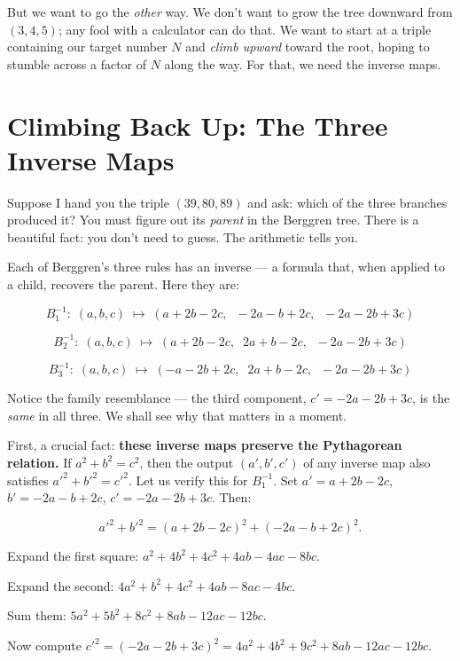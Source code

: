 But we want to go the \textit{other} way. We don't want to grow the tree downward from $(3,4,5)$; any fool with a calculator can do that. We want to start at a triple containing our target number $N$ and \textit{climb upward} toward the root, hoping to stumble across a factor of $N$ along the way. For that, we need the inverse maps.


\ornbreak



\section{Climbing Back Up: The Three Inverse Maps}


Suppose I hand you the triple $(39, 80, 89)$ and ask: which of the three branches produced it? You must figure out its \textit{parent} in the Berggren tree. There is a beautiful fact: you don't need to guess. The arithmetic tells you.

Each of Berggren's three rules has an inverse --- a formula that, when applied to a child, recovers the parent. Here they are:

\[
B_1^{-1}:\; (a,b,c) \;\longmapsto\; (a + 2b - 2c,\;\; -2a - b + 2c,\;\; -2a - 2b + 3c)
\]

\[
B_2^{-1}:\; (a,b,c) \;\longmapsto\; (a + 2b - 2c,\;\; 2a + b - 2c,\;\; -2a - 2b + 3c)
\]

\[
B_3^{-1}:\; (a,b,c) \;\longmapsto\; (-a - 2b + 2c,\;\; 2a + b - 2c,\;\; -2a - 2b + 3c)
\]

Notice the family resemblance --- the third component, $c' = -2a - 2b + 3c$, is the \textit{same} in all three. We shall see why that matters in a moment.

First, a crucial fact: \textbf{these inverse maps preserve the Pythagorean relation.} If $a^2 + b^2 = c^2$, then the output $(a', b', c')$ of any inverse map also satisfies ${a'}^2 + {b'}^2 = {c'}^2$. Let us verify this for $B_1^{-1}$. Set $a' = a + 2b - 2c$, $b' = -2a - b + 2c$, $c' = -2a - 2b + 3c$. Then:

\[
{a'}^2 + {b'}^2 = (a + 2b - 2c)^2 + (-2a - b + 2c)^2.
\]

Expand the first square: $a^2 + 4b^2 + 4c^2 + 4ab - 4ac - 8bc$.

Expand the second: $4a^2 + b^2 + 4c^2 + 4ab - 8ac - 4bc$.

Sum them: $5a^2 + 5b^2 + 8c^2 + 8ab - 12ac - 12bc$.

Now compute ${c'}^2 = (-2a - 2b + 3c)^2 = 4a^2 + 4b^2 + 9c^2 + 8ab - 12ac - 12bc$.

